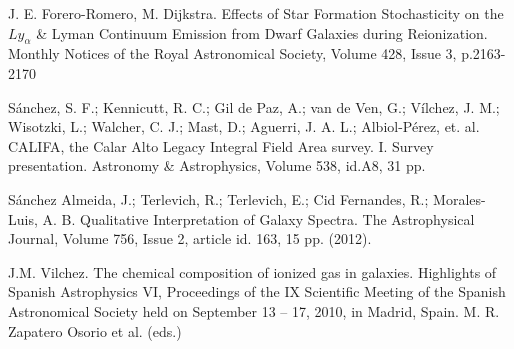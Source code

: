 \documentclass[12pt]{article}
\begin{document}
\begin{thebibliography}{10}

 J. E. Forero-Romero, M. Dijkstra. Effects of Star Formation Stochasticity on the $Ly_{\alpha}$ \&
Lyman Continuum Emission from Dwarf Galaxies during
Reionization. Monthly Notices of the Royal Astronomical Society, Volume 428, Issue 3, p.2163-2170

 S\'anchez, S. F.; Kennicutt, R. C.; Gil de Paz,
A.; van de Ven, G.; V\'ilchez, J. M.; Wisotzki, L.; Walcher, C. J.;
Mast, D.; Aguerri, J. A. L.; Albiol-P\'erez, et. al. CALIFA, the
  Calar Alto Legacy Integral Field Area survey. I. Survey
  presentation. Astronomy \& Astrophysics, Volume 538, id.A8, 31 pp.


 S\'anchez Almeida, J.; Terlevich, R.; Terlevich, E.;
  Cid Fernandes, R.; Morales-Luis, A. B. Qualitative Interpretation of
  Galaxy Spectra. The Astrophysical Journal, Volume 756, Issue 2,
  article id. 163, 15 pp. (2012).

 J.M. Vilchez. The chemical composition of ionized
  gas in galaxies. Highlights of Spanish Astrophysics VI, Proceedings
  of the IX Scientific Meeting of the Spanish Astronomical Society
  held on September 13 -- 17, 2010, in Madrid, Spain. M. R. Zapatero
  Osorio et al. (eds.)


\end{thebibliography}
\end{document}
